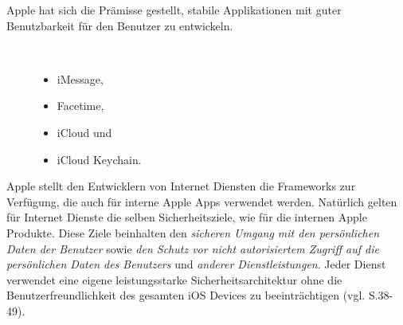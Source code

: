Apple hat sich die Prämisse gestellt, stabile Applikationen mit guter Benutzbarkeit für den Benutzer zu entwickeln. 
\begin{description}
    \item[\parbox{\textwidth} {Beispiele für solche internen iOS Apps sind }]~\par
    \begin{itemize}
       \item iMessage,
       \item Facetime,
       \item iCloud und 
       \item iCloud Keychain.
    \end{itemize}
\end{description} 

Apple stellt den Entwicklern von Internet Diensten die Frameworks zur Verfügung, die auch für interne Apple Apps verwendet werden. Natürlich gelten für Internet Dienste die selben Sicherheitsziele, wie für die internen Apple Produkte. Diese Ziele beinhalten den \textit{\glqq sicheren Umgang mit den persönlichen Daten der Benutzer\grqq{}} sowie \textit{\glqq den Schutz vor nicht autorisiertem Zugriff auf die persönlichen Daten des Benutzers\grqq{}} und \textit{\glqq anderer Dienstleistungen\grqq{}}. Jeder Dienst verwendet eine eigene leistungsstarke Sicherheitsarchitektur ohne die Benutzerfreundlichkeit des gesamten iOS Devices zu beeinträchtigen (vgl. \cite{Apple[4]} S.38-49).

